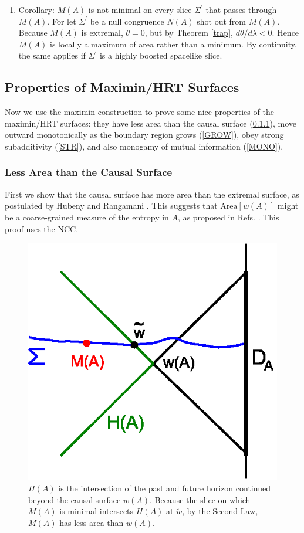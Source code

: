 \documentclass{article}
\begin{document}
\begin{enumerate}[resume]
\begin{enumerate}
	\item Corollary: $M(A)$ is not minimal on every slice $\Sigma^\prime$ that passes through $M(A)$.  For let $\Sigma^\prime$ be a null congruence $N(A)$ shot out from $M(A)$.  Because $M(A)$ is extremal, $\theta = 0$, but by Theorem \ref{trap}, 
$d \theta / d \lambda < 0$.  Hence $M(A)$ is locally a maximum of area rather than a minimum.  By continuity, the same applies if $\Sigma^\prime$ is a highly boosted spacelike slice.
%
	\end{enumerate}
\end{enumerate}

\subsection{Properties of Maximin/HRT Surfaces}\label{props}

Now we use the maximin construction to prove some nice properties of the maximin/HRT surfaces: they have less area than the causal surface (\ref{LESS}), move outward monotonically as the boundary region grows (\ref{GROW}), obey strong subadditivity (\ref{STR}), and also monogamy of mutual information (\ref{MONO}).

\subsubsection{Less Area than the Causal Surface}\label{LESS}

First we show that the causal surface has more area than the extremal surface, as postulated by Hubeny and Rangamani \cite{HR12}.  This suggests that $\mathrm{Area}[w(A)]$ might be a coarse-grained measure of the entropy in $A$, as proposed in Refs. \cite{HR12,coarse}.  This proof uses the NCC.
\begin{figure}[hbt]
\centering
\includegraphics[width=.4\textwidth]{lesser.eps}
\caption{\footnotesize $H(A)$ is the intersection of the past and future horizon continued beyond the causal surface $w(A)$.  Because the slice on which $M(A)$ is minimal intersects $H(A)$ at $\tilde{w}$, by the Second Law, $M(A)$ has less area than $w(A)$.}\label{lesser}
\end{figure}
\end{document}
